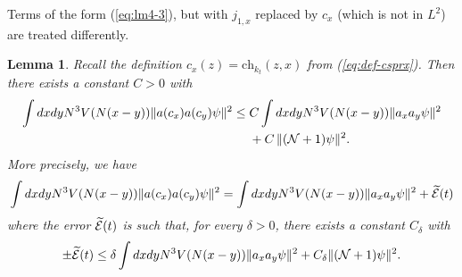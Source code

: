\documentclass[11pt,a4paper]{article}
\newtheorem{lemma}[thm]{Lemma}
\newcommand{\wt}{\widetilde}
\newcommand{\cE}{{\cal E}}
\newcommand{\cN}{{\cal N}}
\begin{document}
Terms of the form (\ref{eq:lm4-3}), but with $j_{1,x}$ replaced by $c_x$ (which is not in $L^2$) are treated differently.
\begin{lemma}\label{lm:4b}
Recall the definition $c_x (z) = \text{ch}_{k_t} (z,x)$ from (\ref{eq:def-csprx}). Then there exists a constant $C>0$ with
\begin{equation}\label{eq:lm4b-1}
\begin{split}
\int dx dy N^3 V(N(x-y)) \| a (c_x) a(c_y) \psi \|^2 \leq \; &C \int dx dy N^3 V (N(x-y)) \| a_x a_y \psi \|^2 \\ &+ C\, \| (\cN+1) \psi \|^2. \end{split} \end{equation}
More precisely, we have 
\begin{equation}\label{eq:lm4b-2} \int dx dy N^3 V(N(x-y)) \| a (c_x) a (c_y) \psi \|^2 = \int dx dy N^3 V(N (x-y)) \| a_x a_y \psi \|^2 + \wt{\cE} (t) \end{equation}
where the error $\wt{\cE} (t)$ is such that, for every $\delta > 0$, there exists a constant $C_\delta$ 
with
\[ \pm \wt{\cE} (t) \leq \delta \int dx dy N^3 V (N (x-y)) \| a_x a_y \psi \|^2 + C_\delta \| (\cN+1) \psi \|^2. \]
\end{lemma}
\end{document}
